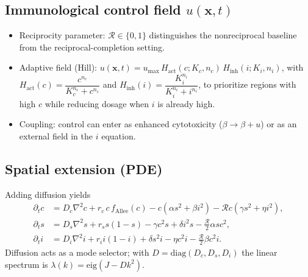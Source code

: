 \subsection{Immunological control field \texorpdfstring{$u(\mathbf{x},t)$}{u(x,t)}}
\begin{itemize}
    \item Reciprocity parameter: $\mathcal{R}\in\{0,1\}$ distinguishes the nonreciprocal baseline from the reciprocal-completion setting.
    \item Adaptive field (Hill): 
    $u(\mathbf{x},t)=u_{\max}\,H_{\mathrm{act}}(c;K_c,n_c)\,H_{\mathrm{inh}}(i;K_i,n_i)$, with
    $H_{\mathrm{act}}(c)=\dfrac{c^{n_c}}{K_c^{n_c}+c^{n_c}}$ and
    $H_{\mathrm{inh}}(i)=\dfrac{K_i^{n_i}}{K_i^{n_i}+i^{n_i}}$,
    to prioritize regions with high $c$ while reducing dosage when $i$ is already high.
    \item Coupling: control can enter as enhanced cytotoxicity ($\beta\to \beta+u$) or as an external field in the $i$ equation.
\end{itemize}

\subsection{Spatial extension (PDE)}
Adding diffusion yields
\begin{align}
\partial_t c &= D_c \nabla^2 c + r_c\, c\, f_{\text{Allee}}(c) - c(\alpha s^2 + \beta i^2) - \mathcal{R} c(\gamma s^2 + \eta i^2), \\
\partial_t s &= D_s \nabla^2 s + r_s s(1-s) - \gamma c^2 s + \delta i^2 s - \tfrac{\mathcal{R}}{2}\alpha s c^2, \\
\partial_t i &= D_i \nabla^2 i + r_i i(1-i) + \delta s^2 i - \eta c^2 i - \tfrac{\mathcal{R}}{2}\beta c^2 i .
\end{align}
Diffusion acts as a mode selector; with $D=\mathrm{diag}(D_c,D_s,D_i)$ the linear spectrum is $\lambda(k)=\mathrm{eig}(J-Dk^2)$.

